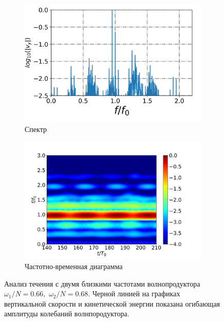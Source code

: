 \documentclass[utf8x]{G7-32} %
\begin{document}
\begin{figure}[h!]
\begin{subfigure}[с]{0.45\textwidth}
    \includegraphics[width=1.1\textwidth]{../pics/H40L60N1ap05dp20w1p63Deltawp05Biharm/spectrumX35p6Y11p2.png}
    \caption{Спектр}
  \end{subfigure}
  \begin{subfigure}[с]{0.45\textwidth}
    \includegraphics[width=1.1\textwidth]{../pics/H40L60N1ap05dp20w1p63Deltawp05Biharm/TFspectrumX35p6Y11p2N200.png}
    \caption{Частотно-временная диаграмма}
    \label{}
  \end{subfigure}
  \caption{
Анализ течения с двумя близкими  частотами волнопродуктора $\omega_1/N=0.66,$ $\omega_2/N=0.68$. Черной линией  на графиках вертикальной скорости и кинетической энергии показана огибающая амплитуды колебаний волнпородуктора.}
  \label{fig:biharmVyap005-1}
 \newpage 
\end{figure}
\newpage
\end{document}

